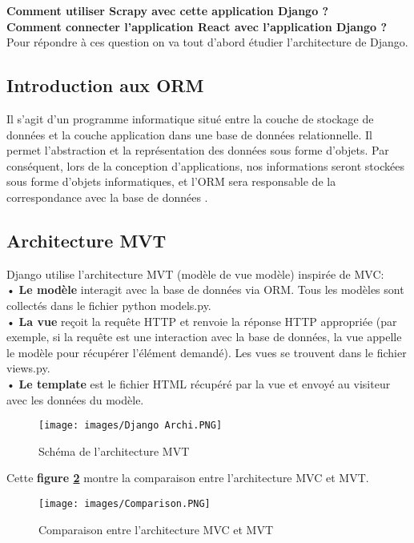 \textbf{Comment utiliser Scrapy avec cette application Django ?}\\

\textbf{Comment connecter l'application React avec l'application Django ?}\\

\noindent Pour répondre à ces question on va tout d'abord étudier l'architecture de Django.
\subsection{Introduction aux ORM}
Il s'agit d'un programme informatique situé entre la couche de stockage de données et la couche application dans une base de données relationnelle. Il permet l'abstraction et la représentation des données sous forme d'objets. Par conséquent, lors de la conception d'applications, nos informations seront stockées sous forme d'objets informatiques, et l'ORM sera responsable de la correspondance avec la base de données \textbf{\cite{orm}}.
\subsection{Architecture MVT}
\noindent Django utilise l'architecture MVT (modèle de vue modèle) inspirée de MVC:\\

• \textbf{Le modèle} interagit avec la base de données via ORM. Tous les modèles sont collectés dans le fichier python models.py.\\

• \textbf{La vue} reçoit la requête HTTP et renvoie la réponse HTTP appropriée (par exemple, si la requête est une interaction avec la base de données, la vue appelle le modèle pour récupérer l'élément demandé). Les vues se trouvent dans le fichier views.py.\\

• \textbf{Le template} est le fichier HTML récupéré par la vue et envoyé au visiteur avec les données du modèle.\\

\begin{figure}[H]
            \centering
            \texttt{[image: images/Django Archi.PNG]}
            \caption{Schéma de l'architecture MVT \cite{djangoarchi}}
            \label{fig:resultat}  
        \end{figure}
\newpage
\noindent Cette \textbf{figure \ref{fig:Comp}} montre la comparaison entre l'architecture MVC et MVT.
\begin{figure}[H]
            \centering
            \texttt{[image: images/Comparison.PNG]}
            \caption{Comparaison entre l'architecture MVC et MVT \cite{mvcmvt}}
            \label{fig:Comp}  
        \end{figure}
